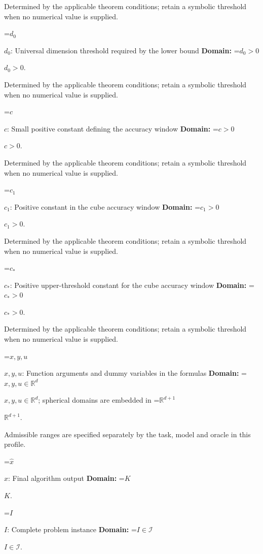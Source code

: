 \documentclass[10pt,a4paper]{article}
\newcommand{\AtlasMath}[1]{\par\begingroup\centering\setbox0=\hbox{$\displaystyle #1$}\ifdim\wd0>1.4\linewidth\typeout{ATLAS WIDE FORMULA: \the\wd0}\fi\ifdim\wd0>\linewidth\resizebox{\linewidth}{!}{\box0}\else\box0\fi\par\endgroup}
\newcommand{\AtlasInlineMath}[1]{\begingroup\setbox0=\hbox{$#1$}\ifdim\wd0>.4\linewidth\endgroup\AtlasMath{#1}\else\endgroup$#1$\fi}
\begin{document}
Determined by the applicable theorem conditions; retain a symbolic threshold when no numerical value is supplied.



\AtlasInlineMath{d_0}: Universal dimension threshold required by the lower bound \textbf{Domain:} \AtlasInlineMath{d_0>0}.



Determined by the applicable theorem conditions; retain a symbolic threshold when no numerical value is supplied.



\AtlasInlineMath{c}: Small positive constant defining the accuracy window \textbf{Domain:} \AtlasInlineMath{c>0}.



Determined by the applicable theorem conditions; retain a symbolic threshold when no numerical value is supplied.



\AtlasInlineMath{c_1}: Positive constant in the cube accuracy window \textbf{Domain:} \AtlasInlineMath{c_1>0}.



Determined by the applicable theorem conditions; retain a symbolic threshold when no numerical value is supplied.



\AtlasInlineMath{c_*}: Positive upper-threshold constant for the cube accuracy window \textbf{Domain:} \AtlasInlineMath{c_*>0}.



Determined by the applicable theorem conditions; retain a symbolic threshold when no numerical value is supplied.



\AtlasInlineMath{x,y,u}: Function arguments and dummy variables in the formulas \textbf{Domain:} \AtlasInlineMath{x,y,u\in\mathbb{R}^d}; spherical domains are embedded in \AtlasInlineMath{\mathbb{R}^{d+1}}.



Admissible ranges are specified separately by the task, model and oracle in this profile.



\AtlasInlineMath{\widehat{x}}: Final algorithm output \textbf{Domain:} \AtlasInlineMath{K}.



\AtlasInlineMath{I}: Complete problem instance \textbf{Domain:} \AtlasInlineMath{I\in\mathcal{I}}.
\end{document}
